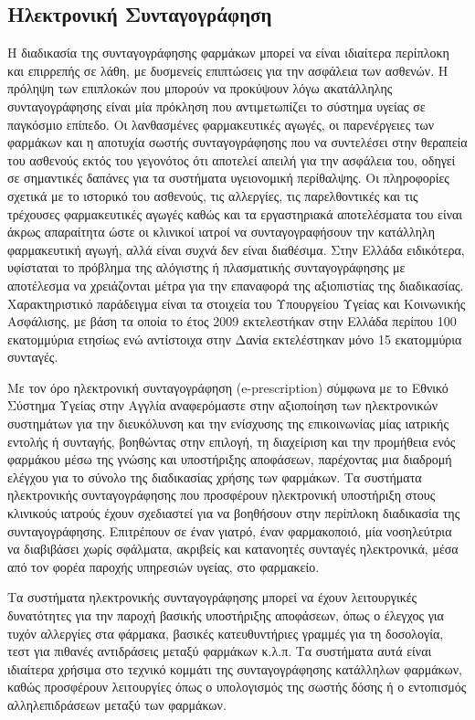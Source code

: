 	\subsection{Ηλεκτρονική Συνταγογράφηση}
	
		Η διαδικασία της συνταγογράφησης φαρμάκων μπορεί να είναι ιδιαίτερα περίπλοκη και επιρρεπής σε λάθη, με
δυσμενείς επιπτώσεις για την ασφάλεια των ασθενών. Η πρόληψη των επιπλοκών που μπορούν να προκύψουν λόγω ακατάλληλης συνταγογράφησης είναι μία πρόκληση που αντιμετωπίζει το σύστημα υγείας σε παγκόσμιο επίπεδο. Οι λανθασμένες φαρμακευτικές αγωγές, οι παρενέργειες των φαρμάκων και η αποτυχία σωστής συνταγογράφησης που να συντελέσει στην θεραπεία του ασθενούς εκτός του γεγονότος ότι αποτελεί απειλή για την ασφάλεια του, οδηγεί σε σημαντικές δαπάνες για τα συστήματα υγειονομική περίθαλψης. Οι πληροφορίες σχετικά με το ιστορικό του ασθενούς, τις αλλεργίες, τις παρελθοντικές και τις τρέχουσες φαρμακευτικές αγωγές καθώς και τα εργαστηριακά αποτελέσματα του είναι άκρως απαραίτητα ώστε οι κλινικοί ιατροί να συνταγογραφήσουν την κατάλληλη φαρμακευτική αγωγή, αλλά είναι συχνά δεν είναι διαθέσιμα. \cite{prescribingErrors} Στην Ελλάδα ειδικότερα, υφίσταται το πρόβλημα της αλόγιστης ή πλασματικής συνταγογράφησης με αποτέλεσμα να  χρειάζονται μέτρα για την επαναφορά της αξιοπιστίας της διαδικασίας.  Χαρακτηριστικό παράδειγμα είναι τα στοιχεία του Υπουργείου Υγείας και Κοινωνικής Ασφάλισης, με βάση τα οποία το έτος 2009 εκτελεστήκαν στην Ελλάδα περίπου 100 εκατομμύρια ετησίως ενώ αντίστοιχα στην Δανία εκτελέστηκαν μόνο 15 εκατομμύρια συνταγές.


		Με τον όρο ηλεκτρονική συνταγογράφηση (e-prescription) σύμφωνα με το Εθνικό Σύστημα Υγείας στην Αγγλία αναφερόμαστε στην αξιοποίηση των ηλεκτρονικών συστημάτων για την διευκόλυνση και την ενίσχυσης της επικοινωνίας μίας ιατρικής εντολής ή συνταγής, βοηθώντας στην επιλογή, τη διαχείριση και την προμήθεια ενός φαρμάκου μέσω της γνώσης και υποστήριξης αποφάσεων, παρέχοντας μια διαδρομή ελέγχου για το σύνολο της διαδικασίας χρήσης των φαρμάκων.  Τα συστήματα ηλεκτρονικής συνταγογράφησης που προσφέρουν ηλεκτρονική υποστήριξη στους κλινικούς ιατρούς έχουν σχεδιαστεί για να βοηθήσουν στην περίπλοκη διαδικασία της συνταγογράφησης. \cite{Kierkegaard2013} Επιτρέπουν σε έναν γιατρό, έναν φαρμακοποιό, μία νοσηλεύτρια να διαβιβάσει χωρίς σφάλματα, ακριβείς και κατανοητές συνταγές ηλεκτρονικά, μέσα από τον φορέα παροχής υπηρεσιών υγείας, στο φαρμακείο.  \cite{eprescr}
		
		
		Τα συστήματα ηλεκτρονικής συνταγογράφησης μπορεί να έχουν λειτουργικές δυνατότητες για την παροχή βασικής υποστήριξης αποφάσεων, όπως ο έλεγχος για τυχόν αλλεργίες στα φάρμακα, βασικές κατευθυντήριες γραμμές για τη δοσολογία, τεστ για πιθανές αντιδράσεις μεταξύ φαρμάκων κ.λ.π. Τα συστήματα αυτά είναι ιδιαίτερα χρήσιμα στο τεχνικό κομμάτι της συνταγογράφησης κατάλληλων φαρμάκων, καθώς προσφέρουν λειτουργίες όπως ο υπολογισμός της σωστής δόσης ή ο εντοπισμός αλληλεπιδράσεων μεταξύ των φαρμάκων. \cite{Kart2008}


